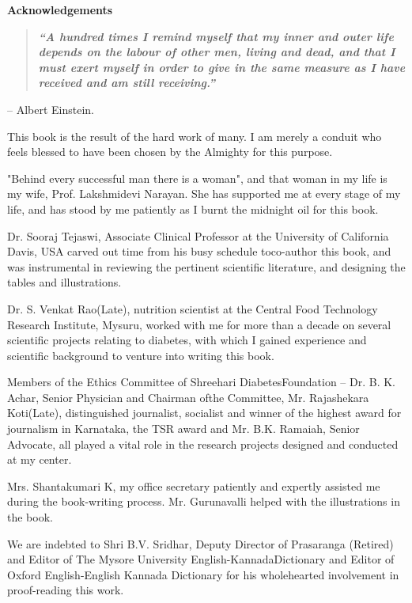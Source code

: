 \thispagestyle{empty}

\begin{center}
\Huge\textbf{Acknowledgements}
\end{center}

\vskip 20pt

{{\setlength{\parskip}{.5em}

\begin{quote}
\textbf{\textit{“A hundred times I remind myself that my inner and outer life depends on the labour of other men, living and dead, and that I must exert myself in order to give in the same measure as I have received and am still receiving.”}}
\end{quote}
\hfill{– Albert Einstein.}

This book is the result of the hard work of many. I am merely a conduit who feels blessed to have been chosen by the Almighty for this purpose.

"Behind every successful man there is a woman", and that woman in my life is my wife, Prof. Lakshmidevi Narayan. She has supported me at every stage of my life, and has stood by me patiently as I burnt the midnight oil for this book.

Dr. Sooraj Tejaswi, Associate Clinical Professor at the University of California Davis, USA carved out time from his busy schedule to\break co-author this book, and was instrumental in reviewing the pertinent scientific literature, and designing the tables and illustrations.

Dr. S. Venkat Rao(Late), nutrition scientist at the Central Food Technology Research Institute, Mysuru, worked with me for more than a decade on several scientific projects relating to diabetes, with which I gained experience and scientific background to venture into writing this book.

Members of the Ethics Committee of Shreehari Diabetes\break Foundation – Dr. B. K. Achar, Senior Physician and Chairman of\break the Committee, Mr. Rajashekara Koti(Late), distinguished journalist, socialist and winner of the highest award for journalism in Karnataka, the TSR award and Mr. B.K. Ramaiah, Senior Advocate, all played a vital role in the research projects designed and conducted at my center.}

{\setlength{\parskip}{.2em}
Mrs. Shantakumari K, my office secretary patiently and expertly assisted me during the book-writing process. Mr. Gurunavalli helped with the illustrations in the book.

We are indebted to Shri B.V. Sridhar, Deputy Director of Prasaranga (Retired) and Editor of The Mysore University English-Kannada\break Dictionary and Editor of Oxford English-English Kannada Dictionary for his wholehearted involvement in proof-reading this work.

}}

